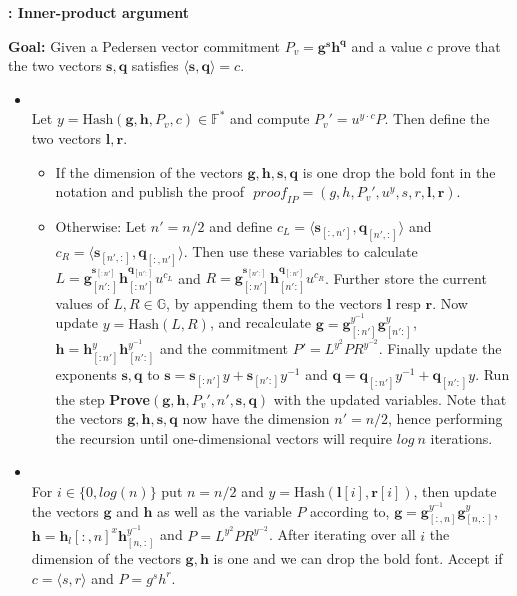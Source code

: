 \begin{algorithm}
\caption{\textbf{: Inner-product argument}}
\textbf{Goal:} Given a Pedersen vector  commitment $P_v=\bm{g}^{\bm{s}} \bm{h}^{\bm{q}}$ and a value $c$ prove that the two vectors $\bm{s},\bm{q}$ satisfies $\langle\bm{s},\bm{q}\rangle=c$.
\vspace{2pt}
\hline
\vspace{2pt}
\begin{itemize}
\item{}\\
Let $y=\text{Hash}(\mathbf{g},\mathbf{h},P_v,c) \in\mathds{F}^*$ and compute $P_v'= u^{y\cdot c}P$. Then define the two vectors $\mathbf{l},\mathbf{r}$.
\begin{itemize}
    \item If the dimension of the vectors $\mathbf{g},\mathbf{h},\mathbf{s},\mathbf{q}$ is one drop the bold font in the notation and publish the proof $\textit{ proof}_{IP}=(g,h,P_v',u^y,s,r,\mathbf{l},\mathbf{r})$.
    \item  Otherwise:  Let $n'=n/2$ and define  $c_L=\langle \bm{s}_{[:,n']},\bm{q}_{[n',:]} \rangle$ and $c_R=\langle \bm{s}_{[n',:]},\bm{q}_{[:,n']} \rangle$. Then use these variables to calculate $L=\mathbf{g}_{[n':]}^{\mathbf{s}_{[:n']}} \mathbf{h}_{[:n']}^{\mathbf{q}_{[n':]}} u^{c_L}$ and $R=\mathbf{g}_{[:n']}^{\mathbf{s}_{[n':]}} \mathbf{h}_{[n':]}^{\mathbf{q}_{[:n']}} u^{c_R}$. Further store the current values of $L,R\in\mathds{G}$, by appending them to the vectors $\mathbf{l}$ resp $\mathbf{r}$. Now update $y=\text{Hash}(L,R)$, and recalculate $\mathbf{g} = \mathbf{g}_{[:n']}^{y^{-1}}\mathbf{g}_{[n':]}^{y}$, $\mathbf{h} = \mathbf{h}_{[:n']}^{y}\mathbf{h}_{[n':]}^{y^{-1}}$ and the commitment $P'=L^{y^2}PR^{y^{-2}}$. Finally update the exponents $\mathbf{s},\mathbf{q}$ to $\mathbf{s} = \mathbf{s}_{[:n']}y+\mathbf{s}_{[n':]}y^{-1}$ and $\mathbf{q} = \mathbf{q}_{[:n']}y^{-1}+\mathbf{q}_{[n':]}y$. Run the step \textbf{Prove}$(\mathbf{g},\mathbf{h},P_v',n',\mathbf{s},\mathbf{q})$ with the updated variables. Note that the vectors $\mathbf{g},\mathbf{h},\mathbf{s},\mathbf{q}$ now have the dimension $n'=n/2$, hence performing the recursion until one-dimensional vectors will require $log\:n$ iterations.
\end{itemize}
\item{}\\
For $i\in\{0,log(n)\}$ put $n=n/2$ and $y=\text{Hash}(\bm{l}[i],\bm{r}[i])$, then update the vectors $\bm{g}$ and $\bm{h}$ as well as the  variable $P$ according to, $\bm{g}= \bm{g}_{[:,n]}^{y^{-1}}\bm{g}_{[n,:]}^{y}$, $\bm{h}= \bm{h}_l{[:,n]}^{x}\bm{h}_{[n,:]}^{y^{-1}}$ and $ P = L^{y^2}PR^{y^{-2}}  $. After iterating over all $i$ the dimension of the vectors $\bm{g},\bm{h}$ is one and we can drop the bold font. Accept if $c=\langle s,r\rangle$ and $P =g^sh^r$.
\end{itemize}
\label{alg:inner_product}
\end{algorithm}

